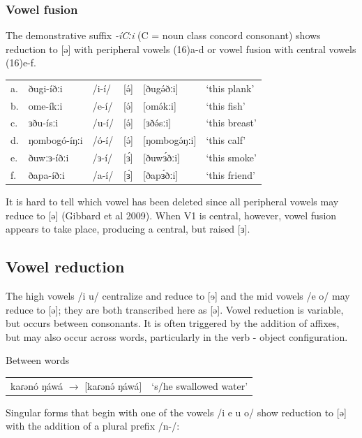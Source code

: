 
\subsubsection{Vowel fusion}
The demonstrative suffix \textit{-íCːi} (C = noun class concord consonant) shows reduction to [ə] with peripheral vowels (16)a-d or vowel fusion with central vowels (16)e-f.

\ea
\begin{tabular}[t]{llllll}
a.&	ðugi-íðːi	&	/i-í/&	[ə́]	&[ðugə́ðːi]	&‘this plank’\\
b.&	ome-íkːi	&	/e-í/&	[ə́]	&[omə́kːi]	&‘this fish’\\
c.&	ɜðu-ísːi	&	/u-í/&	[ə́]	&[ɜðə́sːi]	&	‘this breast’\\
d.&	ŋombogó-íŋːi&	/ó-í/&	[ə́]	&[ŋombogə́ŋːi]&	‘this calf’\\
e.&	ðuwːɜ-íðːi	&	/ɜ-í/&	[ɜ́]	&[ðuwɜ́ðːi]	&‘this smoke’\\
f.&	ðapa-íðːi	&	/a-í/&	[ɜ́]	&[ðapɜ́ðːi]	&‘this friend’\\
\end{tabular}
\z

It is hard to tell which vowel has been deleted since all peripheral vowels may reduce to [ə] (Gibbard et al 2009). When V1 is central, however, vowel fusion appears to take place, producing a central, but raised [ɜ].

\subsection{Vowel reduction}\label{sec:ch5:vreduction}
The high vowels /i u/ centralize and reduce to [ɘ] and the mid vowels /e o/ may reduce to [ə]; they are both transcribed here as [ə]. Vowel reduction is variable, but occurs between consonants. It is often triggered by the addition of affixes, but may also occur across words, particularly in the verb - object configuration.

\ea Between words
\begin{tabular}[t]{ll}
kaɾənó ŋáwá  $\rightarrow$ [kaɾənə́ ŋáwá]	&	‘s/he swallowed water’\\
\end{tabular}
\z

Singular forms that begin with one of the vowels /i e u o/ show reduction to [ə] with the addition of a plural prefix /n-/:

